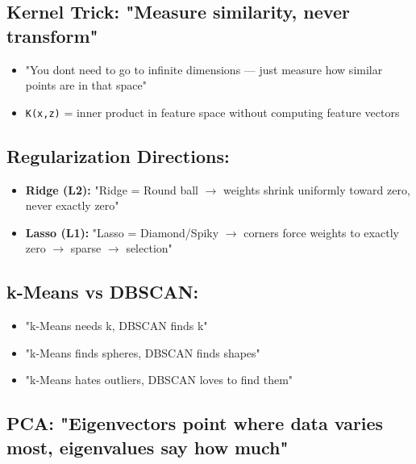 \documentclass[11pt]{article}
\providecommand{\tightlist}{\setlength{\itemsep}{1pt}\setlength{\parskip}{0pt}}
\begin{document}
\subsection{Kernel Trick: "Measure similarity, never transform"}\label{kernel-trick-measure-similarity-never-transform}

\begin{itemize}
\tightlist
\item
  "You don\textquotesingle t need to go to infinite dimensions --- just measure how similar points are in that space"
\item
  \texttt{K(x,z)} = inner product in feature space without computing feature vectors
\end{itemize}

\subsection{Regularization Directions:}\label{regularization-directions}

\begin{itemize}
\tightlist
\item
  \textbf{Ridge (L2):} "Ridge = Round ball \(\rightarrow\) weights shrink uniformly toward zero, never exactly zero"
\item
  \textbf{Lasso (L1):} "Lasso = Diamond/Spiky \(\rightarrow\) corners force weights to exactly zero \(\rightarrow\) sparse \(\rightarrow\) selection"
\end{itemize}

\subsection{k-Means vs DBSCAN:}\label{k-means-vs-dbscan}

\begin{itemize}
\tightlist
\item
  "k-Means needs k, DBSCAN finds k"
\item
  "k-Means finds spheres, DBSCAN finds shapes"
\item
  "k-Means hates outliers, DBSCAN loves to find them"
\end{itemize}

\subsection{PCA: "Eigenvectors point where data varies most, eigenvalues say how much"}\label{pca-eigenvectors-point-where-data-varies-most-eigenvalues-say-how-much}
\end{document}
